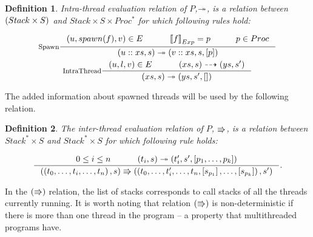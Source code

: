 \documentclass[..thesis.tex]{subfiles}
\newtheorem{defin}{Definition}[section]
\begin{document}
\begin{defin}

  Intra-thread evaluation relation of $P$,$\twoheadrightarrow$,
  is a relation between $\left( Stack \times S \right)$ and $Stack \times S \times Proc^\ast$ for which following rules hold:

  \addtolength{\jot}{2em}
  \begin{gather*}
    \inference[Spawn]{\lp u, spawn(f), v \rp \in E  \separ  \lllb f \rrrb_{Exp} = p \separ p \in Proc  }{ \lp u :: xs, s \rp \intrathread \lp v :: xs, s, \lbk p \rbk \rp} \\
    \inference[IntraThread] {\lp u, l , v \rp \in E \separ \lp xs , s \rp \interproc \lp ys, s' \rp }{ \lp xs , s \rp \intrathread \lp ys, s', \lbk \rbk \rp}
  \end{gather*}
  \addtolength{\jot}{-2em}

\end{defin}


The added information about spawned threads will be used by the following relation.

\begin{defin}

  The inter-thread evaluation relation of $P$, $\Rrightarrow$,
  is a relation between $Stack^\ast \times S$ and  $Stack^\ast \times S$  for which following rule holds:   

  \begin{equation*}
    \inference{ 0 \leq i \leq n  \separ \lp t_i , s \rp \intrathread \lp t'_i, s', \lbk p_1, \ldots, p_k \rbk \rp}{ \lp \lp t_0, \ldots,t_i, \ldots, t_n \rp, s \rp \interthread  \lp \lp t_0, \ldots,t'_i, \ldots, t_n, \lbk s_{p_1} \rbk, \ldots, \lbk s_{p_k} \rbk  \rp , s' \rp} \text{.}
  \end{equation*}

\end{defin}

In the $\left( \Rrightarrow \right)$ relation, the list of stacks corresponds to call stacks of all the threads currently running.
It is worth noting that relation $\left( \Rrightarrow \right)$ is non-deterministic if there is more than one thread in the program -- a property that multithreaded programs have.
\end{document}
